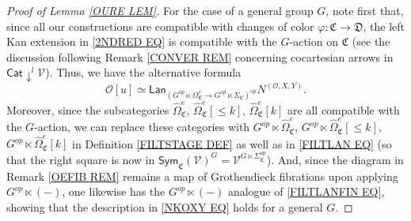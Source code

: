 \documentclass[a4paper,10pt
,draft
]{article}%
\numberwithin{equation}{section}
\numberwithin{figure}{section}
\theoremstyle{definition} %
\newcommand{\V}{\ensuremath{\mathcal V}}
\renewcommand{\O}{\ensuremath{\mathcal O}}
\newcommand{\1}{\ensuremath{\mathbbm 1}}%
\begin{document}
\begin{proof}[Proof of Lemma \ref{OURE LEM}]
	For the case of a general group $G$,
	note first that, since all our constructions 
	are compatible with changes of color
	$\varphi \colon \mathfrak{C} \to \mathfrak{D}$,
	the left Kan extension in \eqref{2NDRED EQ}
	is compatible with the $G$-action on $\mathfrak{C}$
	(see the discussion following Remark \ref{CONVER REM}
	concerning cocartesian arrows in $\mathsf{Cat} \downarrow^l \V$).
	Thus, we have the alternative formula
	\begin{equation}\label{3RDRED EQ}
	\O[u] \simeq
	\mathsf{Lan}_{\left(G^{op} \ltimes \Omega_{\mathfrak C}^{e} 
		\to
		G^{op} \ltimes \Sigma_{\mathfrak C}\right)^{op}} N^{(\O,X,Y)}.
	\end{equation}
%	
	Moreover, since the subcategories 
	$\widehat{\Omega}_{\mathfrak{C}}^e$,
	$\widehat{\Omega}_{\mathfrak{C}}^e[\leq k]$,
	$\widehat{\Omega}_{\mathfrak{C}}^e[k]$
	are all compatible with the $G$-action, we can replace these categories with 
	$G^{op} \ltimes \widehat{\Omega}_{\mathfrak{C}}^e$,
	$G^{op} \ltimes \widehat{\Omega}_{\mathfrak{C}}^e[\leq k]$,
	$G^{op} \ltimes \widehat{\Omega}_{\mathfrak{C}}^e[k]$
	in Definition \ref{FILTSTAGE DEF}
	as well as in \eqref{FILTLAN EQ}
	(so that the right square is now in 
	$\mathsf{Sym}_{\mathfrak{C}}(\mathcal{V})^G = \V^{G \ltimes \Sigma^{op}_{\mathfrak{C}}}$).
	And, since the diagram in Remark \ref{OEFIB REM}
	remains a map of Grothendieck fibrations 
	upon applying $G^{op} \ltimes (-)$,
	one likewise has the $G^{op} \ltimes (-)$ analogue of
	\eqref{FILTLANFIN EQ},
	showing that the description in 
	\eqref{NKOXY EQ} holds for a general $G$.
\end{proof}
\end{document}
